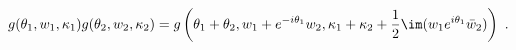 \begin{equation}
 g(\theta_1,w_1,\kappa_1)g(\theta_2,w_2,\kappa_2) 
 = g \left( \theta_1 + \theta_2 , w_1 + e^{ - i \theta_1} w_2 , 
   \kappa_1 + \kappa_2 + \frac{1}{2}
    \im (w_1 e^{ i \theta_1} \bar w_2) \right ) ~.
\end{equation}

